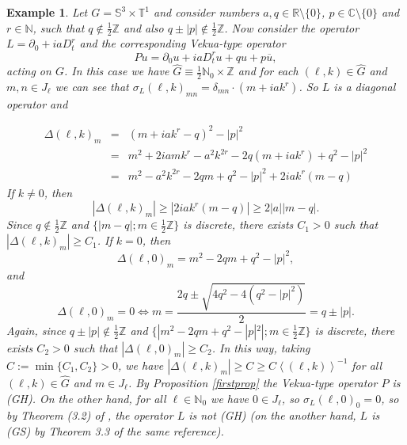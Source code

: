 \documentclass[sn-mathphys-num]{sn-jnl}%
\numberwithin{equation}{section}
\theoremstyle{thmstyleone}
\theoremstyle{thmstyletwo}
\newtheorem{example}{Example}[section]
\theoremstyle{thmstylethree}
\def\jp#1{{\left\langle{#1}\right\rangle}}
\begin{document}
\begin{example} Let $G=\mathbb{S}^3 \times \mathbb{T}^1$ and consider numbers $a,q \in \mathbb{R}\setminus\{0\}$, $p \in \mathbb{C}\setminus \{0\}$ and $r \in \mathbb{N}$, such that $q \notin \frac{1}{2}\mathbb{Z}$ and also $q\pm |p| \notin \frac{1}{2}\mathbb{Z}$. Now consider the operator $L=\partial_0+ia D_t^r$ and the corresponding Vekua-type operator 
	$$Pu=\partial_0 u +iaD_t^ru+qu+p\overline{u},$$
	acting on $G$. In this case we have $\widehat{G} \equiv \frac{1}{2}\mathbb{N}_0 \times \mathbb{Z}$ and for each $(\ell,k) \in \widehat{G}$ and $m,n \in J_\ell$ we can see that $\sigma_L(\ell,k)_{mn}=\delta_{mn}\cdot (m+iak^r)$. So $L$ is a diagonal operator and

\begin{eqnarray*} \Delta(\ell,k)_m & = & (m+iak^r-q)^2-|p|^2   \\
	& = & m^2+2iamk^r-a^2k^{2r}-2q(m+iak^r)+q^2-|p|^2 \\
	& = & m^2-a^2k^{2r}-2qm+q^2-|p|^2+2iak^r(m-q)
\end{eqnarray*} 
If $k\neq 0$, then 
$$|\Delta(\ell,k)_m| \geq |2iak^r(m-q)| \geq 2|a||m-q|.$$
Since $q \notin \frac{1}{2}\mathbb{Z}$ and $\{|m-q|; m \in \frac{1}{2}\mathbb{Z}\}$ is discrete, there exists $C_1>0$ such that $|\Delta(\ell,k)_m| \geq C_1$.
If $k=0$, then 
$$\Delta(\ell,0)_m = m^2-2qm+q^2-|p|^2,$$
and 
$$\Delta(\ell,0)_m = 0 \Leftrightarrow m=\frac{2q\pm \sqrt{4q^2-4(q^2-|p|^2)}}{2}=q\pm |p|.$$
Again, since $q\pm |p| \notin \frac{1}{2}\mathbb{Z}$ and $\{|m^2 -2qm+q^2-|p|^2|; m \in \frac{1}{2}\mathbb{Z}\}$ is discrete, there exists $C_2>0$ such that $|\Delta(\ell,0)_m| \geq C_2$. In this way, taking $C:=\min\{C_1,C_2\}>0$, we have $|\Delta(\ell,k)_m| \geq C  \geq C \jp{(\ell,k)}^{-1}$ for all $(\ell,k) \in \widehat{G}$ and $m \in J_\ell$. By Proposition \ref{firstprop} the Vekua-type operator $P$ is (GH). On the other hand, for all $\ell \in \mathbb{N}_0$ we have $0 \in J_\ell$, so $\sigma_L(\ell,0)_0=0$, so by Theorem (3.2) of \cite{da2025diagonal}, the operator $L$ is not (GH) (on the another hand, $L$ is (GS) by Theorem 3.3 of the same reference). 

\end{example} 
\end{document}
